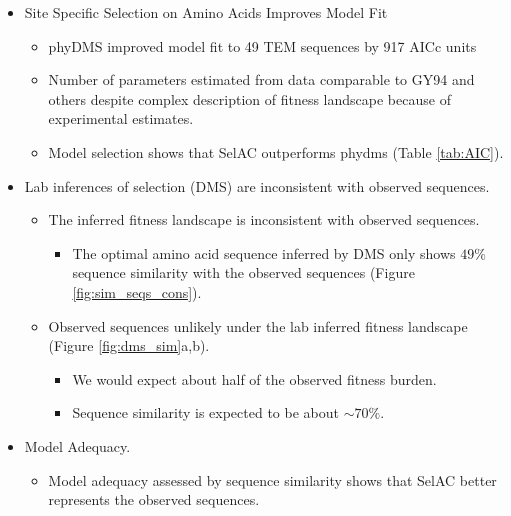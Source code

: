 \documentclass[12pt]{article}
\begin{document}
\begin{itemize}
	\item Site Specific Selection on Amino Acids Improves Model Fit
	\begin{itemize}
		\item phyDMS improved model fit to 49 TEM sequences by 917 AICc units
		\item Number of parameters estimated from data comparable to GY94 and others despite complex description of fitness landscape because of experimental estimates.
		\item Model selection shows that SelAC outperforms phydms (Table \ref{tab:AIC}).
	\end{itemize}

  
	\item Lab inferences of selection (DMS) are inconsistent with observed sequences.
	\begin{itemize}
 		\item The inferred fitness landscape is inconsistent with observed sequences.
		\begin{itemize}
			\item The optimal amino acid sequence inferred by DMS only shows $49 \%$ sequence similarity with the observed sequences (Figure \ref{fig:sim_seqs_cons}).
		\end{itemize}
		\item Observed sequences unlikely under the lab inferred fitness landscape (Figure \ref{fig:dms_sim}a,b).
		\begin{itemize}
			\item We would expect about half of the observed fitness burden.
			\item Sequence similarity is expected to be about $\sim 70 \%$.
		\end{itemize}
	\end{itemize}

	\item \selac Model Adequacy.
	\begin{itemize}
		\item Model adequacy assessed by sequence similarity shows that SelAC better represents the observed sequences.
	\end{itemize}


\end{itemize}
\end{document}

